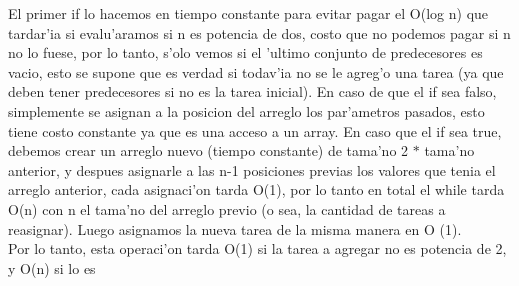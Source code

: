 \documentclass[a4paper,10pt]{article}
\begin{document}
\begin{algoritmo}
   El primer if lo hacemos en tiempo constante para evitar pagar el O(log n) que tardar'ia si evalu'aramos si n es potencia de dos, costo que no podemos pagar si n no lo fuese, por lo tanto, s'olo vemos si el 'ultimo conjunto de predecesores es vacio, esto se supone que es verdad si todav'ia no se le agreg'o una tarea (ya que deben tener predecesores si no es la tarea inicial). En caso de que el if sea falso, simplemente se asignan a la posicion del arreglo los par'ametros pasados, esto tiene costo constante ya que es una acceso a un array. En caso que el if sea true, debemos crear un arreglo nuevo (tiempo constante) de tama'no 2 $*$ tama'no anterior, y despues asignarle a las n-1 posiciones previas los valores que tenia el arreglo anterior, cada asignaci'on tarda O(1), por lo tanto en total el while tarda O(n) con n el tama'no del arreglo previo (o sea, la cantidad de tareas a reasignar). Luego asignamos la nueva tarea de la misma manera en O (1).\\
   
   Por lo tanto, esta operaci'on tarda O(1) si la tarea a agregar no es potencia de 2, y O(n) si lo es
   
\end{algoritmo}
\end{document}
